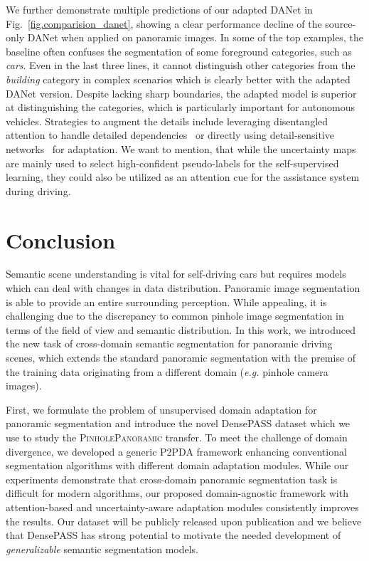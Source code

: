 \documentclass[journal]{IEEEtran}
\begin{document}
We further demonstrate multiple predictions of our adapted DANet in Fig.~\ref{fig.comparision_danet}, showing a clear performance decline of the source-only DANet when applied on panoramic images.
In some of the top examples, the baseline often confuses the segmentation of some foreground categories, such as  \emph{cars}.
Even in the last three lines, it cannot distinguish other categories from the \emph{building} category in complex scenarios which is clearly better with the adapted DANet version.
Despite lacking sharp boundaries, the adapted model is superior at distinguishing the categories, which is particularly important for autonomous vehicles.
Strategies to augment the details include leveraging disentangled attention to handle detailed dependencies~\cite{omnirange} or directly using detail-sensitive networks~\cite{panopticfpn,dspass} for adaptation.
We want to mention, that while the uncertainty maps are mainly used to select high-confident pseudo-labels for the self-supervised learning, they could also be utilized as an attention cue for the assistance system during driving.

\section{Conclusion}

Semantic scene understanding is vital for self-driving cars but requires models which can deal with changes in data distribution.
Panoramic image segmentation is able to provide an entire  surrounding perception. While appealing, it is challenging due to the discrepancy to common pinhole image segmentation in terms of the field of view and semantic distribution.
In  this  work,  we introduced the new task of cross-domain semantic segmentation for panoramic driving scenes, which extends the standard panoramic segmentation with the premise of the training data originating from a different domain (\textit{e.g.} pinhole camera images).

First, we formulate the problem of unsupervised domain adaptation for panoramic segmentation and introduce the novel DensePASS dataset which we use to study the \textsc{PinholePanoramic} transfer.
To meet the challenge of domain divergence, we developed a generic P2PDA framework enhancing conventional segmentation algorithms with different domain adaptation modules.
While our experiments demonstrate that cross-domain panoramic segmentation task is difficult for modern algorithms, our proposed domain-agnostic framework with attention-based and uncertainty-aware adaptation modules consistently improves the results.
Our dataset will be publicly released upon publication and we believe that DensePASS has strong  potential to motivate the needed development of \emph{generalizable} semantic segmentation models.
\end{document}
